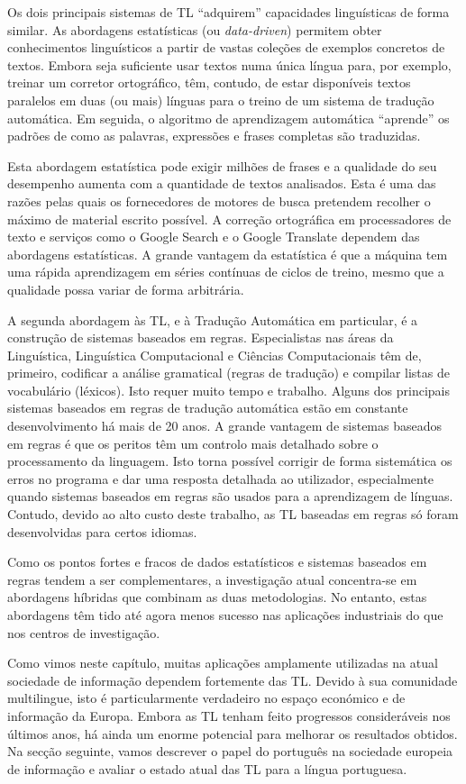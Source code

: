 \begin{multicols}{2}
Os dois principais sistemas de TL  “adquirem” capacidades linguísticas de forma similar. As abordagens estatísticas (ou \textit{data-driven}) permitem obter conhecimentos linguísticos a partir de vastas coleções de exemplos concretos de textos. Embora seja suficiente usar textos numa única língua para, por exemplo, treinar um corretor ortográfico, têm, contudo, de estar disponíveis textos paralelos em duas (ou mais) línguas para o treino de um sistema de tradução automática. Em seguida, o algoritmo de aprendizagem automática “aprende” os padrões de como as palavras, expressões e frases completas são traduzidas.

Esta abordagem estatística pode exigir milhões de frases e a qualidade do seu desempenho aumenta com a quantidade de textos analisados. Esta é uma das razões pelas quais os fornecedores de motores de busca pretendem recolher o máximo de material escrito possível. A correção ortográfica em processadores de texto e serviços como o Google Search e o Google Translate dependem das abordagens estatísticas. A grande vantagem da estatística é que a máquina tem uma rápida aprendizagem em séries contínuas de ciclos de treino, mesmo que a qualidade possa variar de forma arbitrária.

A segunda abordagem às TL, e à Tradução Automática em particular, é a construção de sistemas baseados em regras. Especialistas nas áreas da Linguística, Linguística Computacional e Ciências Computacionais têm de, primeiro, codificar a análise gramatical (regras de tradução) e compilar listas de vocabulário (léxicos). Isto requer muito tempo e trabalho. Alguns dos principais sistemas baseados em regras de tradução automática estão em constante desenvolvimento há mais de 20 anos. A grande vantagem de sistemas baseados em regras é que os peritos têm um controlo mais detalhado sobre o processamento da linguagem. Isto torna possível corrigir de forma sistemática os erros no programa e dar uma resposta detalhada ao utilizador, especialmente quando sistemas baseados em regras são usados para a aprendizagem de línguas. Contudo, devido ao alto custo deste trabalho, as TL baseadas em regras só foram desenvolvidas para certos idiomas.

Como os pontos fortes e fracos de dados estatísticos e sistemas baseados em regras tendem a ser complementares, a investigação atual concentra-se em abordagens híbridas que combinam as duas metodologias. No entanto, estas abordagens têm tido até agora menos sucesso nas aplicações industriais do que nos centros de investigação.

Como vimos neste capítulo, muitas aplicações amplamente utilizadas na atual sociedade de informação dependem fortemente das TL. Devido à sua comunidade multilingue, isto é particularmente verdadeiro no espaço económico e de informação da Europa. Embora as TL tenham feito progressos consideráveis nos últimos anos, há ainda um enorme potencial para melhorar os resultados obtidos. Na secção seguinte, vamos descrever o papel do português na sociedade europeia de informação e avaliar o estado atual das TL para a língua portuguesa.

\end{multicols}

